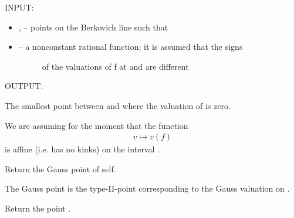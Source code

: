 \documentclass[letterpaper,10pt,english]{sphinxmanual}
\begin{document}
\begin{fulllineitems}
\begin{fulllineitems}
INPUT:
\begin{itemize}
\item {} \begin{description}
\item[{,  -- points on the Berkovich line such that}] \leavevmode
{}

\end{description}

\item {} \begin{description}
\item[{ -- a nonconstant rational function; it is assumed that the signs}] \leavevmode
of the valuations of f at  and  are different

\end{description}

\end{itemize}

OUTPUT:

The smallest point between  and  where the valuation of 
is zero.

We are assuming for the moment that the function
\begin{equation*}
\begin{split}v \mapsto v(f)\end{split}
\end{equation*}
is affine (i.e. has no kinks) on the interval \titleref{{[}xi\_1,xi\_2{]}}.

\end{fulllineitems}


\begin{fulllineitems}
\label{berkovich_line:mclf.berkovich.berkovich_line.BerkovichLine.gauss_point}
Return the Gauss point of self.

The Gauss point is the type-II-point corresponding to the Gauss
valuation on .

\end{fulllineitems}


\begin{fulllineitems}
\label{berkovich_line:mclf.berkovich.berkovich_line.BerkovichLine.infty}
Return the point .


\end{fulllineitems}
\end{fulllineitems}
\end{document}
